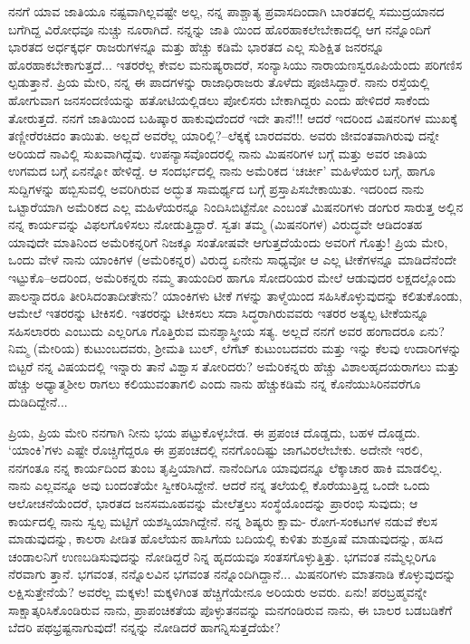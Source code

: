 ನನಗೆ ಯಾವ ಜಾತಿಯೂ ನಷ್ಟವಾಗಿಲ್ಲವಷ್ಟೇ ಅಲ್ಲ, ನನ್ನ ಪಾಶ್ಚಾತ್ಯ ಪ್ರವಾಸದಿಂದಾಗಿ ಬಾರತದಲ್ಲಿ ಸಮುದ್ರಯಾನದ ಬಗೆಗಿದ್ದ ವಿರೋಧವೂ ನುಚ್ಚು ನೂರಾಗಿದೆ. ನನ್ನನ್ನು ಜಾತಿ ಯಿಂದ ಹೊರಹಾಕಲೇಬೇಕಾದಲ್ಲಿ ಆಗ ನನ್ನೊಂದಿಗೆ ಭಾರತದ ಅರ್ಧಕ್ಕರ್ಧ ರಾಜರುಗಳನ್ನೂ ಮತ್ತು ಹೆಚ್ಚು ಕಡಿಮೆ ಭಾರತದ ಎಲ್ಲ ಸುಶಿಕ್ಷಿತ ಜನರನ್ನೂ ಹೊರಹಾಕಬೇಕಾಗುತ್ತದೆ... ಇತರರೆಲ್ಲ ಕೇವಲ ಮನುಷ್ಯರಾದರೆ, ಸಂನ್ಯಾಸಿಯು ನಾರಾಯಣಸ್ವರೂಪಿಯೆಂದು ಪರಿಗಣಿಸ ಲ್ಪಡುತ್ತಾನೆ. ಪ್ರಿಯ ಮೇರಿ, ನನ್ನ ಈ ಪಾದಗಳನ್ನು ರಾಜಾಧಿರಾಜರು ತೊಳೆದು ಪೂಜಿಸಿದ್ದಾರೆ. ನಾನು ರಸ್ತೆಯಲ್ಲಿ ಹೋಗುವಾಗ ಜನಸಂದಣಿಯನ್ನು ಹತೋಟಿಯಲ್ಲಿಡಲು ಪೋಲಿಸರು ಬೇಕಾಗಿದ್ದರು ಎಂದು ಹೇಳಿದರೆ ಸಾಕೆಂದು ತೋರುತ್ತದೆ. ನನಗೆ ಜಾತಿಯಿಂದ ಬಹಿಷ್ಕಾರ ಹಾಕುವುದೆಂದರೆ ಇದೇ ತಾನೆ!!! ಆದರೆ ಇದರಿಂದ ವಿಷನರಿಗಳ ಮುಖಕ್ಕೆ ತಣ್ಣೀರೆರಚಿದಂ ತಾಯಿತು. ಅಲ್ಲದೆ ಅವರೆಲ್ಲ ಯಾರಿಲ್ಲಿ?–ಲೆಕ್ಕಕ್ಕೆ ಬಾರದವರು. ಅವರು ಜೀವಂತವಾಗಿರುವು ದನ್ನೇ ಅರಿಯದೆ ನಾವಿಲ್ಲಿ ಸುಖವಾಗಿದ್ದೆವು. ಉಪನ್ಯಾಸವೊಂದರಲ್ಲಿ ನಾನು ಮಿಷನರಿಗಳ ಬಗ್ಗೆ ಮತ್ತು ಅವರ ಜಾತಿಯ ಉಗಮದ ಬಗ್ಗೆ ಏನನ್ನೋ ಹೇಳಿದ್ದೆ. ಆ ಸಂದರ್ಭದಲ್ಲಿ ನಾನು ಅಮೆರಿಕದ ‘ಚರ್ಚೀ’ ಮಹಿಳೆಯರ ಬಗ್ಗೆ, ಹಾಗೂ ಸುದ್ದಿಗಳನ್ನು ಹಬ್ಬಿಸುವಲ್ಲಿ ಅವರಿಗಿರುವ ಅದ್ಭುತ ಸಾಮರ್ಥ್ಯದ ಬಗ್ಗೆ ಪ್ರಸ್ತಾಪಿಸಬೇಕಾಯಿತು. ಇದರಿಂದ ನಾನು ಒಟ್ಟಾರೆಯಾಗಿ ಅಮೆರಿಕದ ಎಲ್ಲ ಮಹಿಳೆಯರನ್ನೂ ನಿಂದಿಸಿಬಿಟ್ಟೆನೋ ಎಂಬಂತೆ ಮಿಷನರಿಗಳು ಡಂಗುರ ಸಾರುತ್ತ ಅಲ್ಲಿನ ನನ್ನ ಕಾರ್ಯವನ್ನು ವಿಫಲಗೊಳಿಸಲು ನೋಡುತ್ತಿದ್ದಾರೆ. ಸ್ವತಃ ತಮ್ಮ (ಮಿಷನರಿಗಳ) ವಿರುದ್ಧವೇ ಆಡಿದಂತಹ ಯಾವುದೇ ಮಾತಿನಿಂದ ಅಮೆರಿಕನ್ನರಿಗೆ ನಿಜಕ್ಕೂ ಸಂತೋಷವೇ ಆಗುತ್ತದೆಯೆಂದು ಅವರಿಗೆ ಗೊತ್ತು! ಪ್ರಿಯ ಮೇರಿ, ಒಂದು ವೇಳೆ ನಾನು ಯಾಂಕಿಗಳ (ಅಮೆರಿಕನ್ನರ) ವಿರುದ್ಧ ಏನೇನು ಸಾಧ್ಯವೋ ಆ ಎಲ್ಲ ಟೀಕೆಗಳನ್ನೂ ಮಾಡಿದೆನೆಂದೇ ಇಟ್ಟುಕೊ–ಅದರಿಂದ, ಅಮೆರಿಕನ್ನರು ನಮ್ಮ ತಾಯಂದಿರ ಹಾಗೂ ಸೋದರಿಯರ ಮೇಲೆ ಆಡುವುದರ ಲಕ್ಷದಲ್ಲೊಂದು ಪಾಲನ್ನಾದರೂ ತೀರಿಸಿದಂತಾದೀತೇನು? ಯಾಂಕಿಗಳು ಟೀಕೆ ಗಳನ್ನು ತಾಳ್ಮೆಯಿಂದ ಸಹಿಸಿಕೊಳ್ಳುವುದನ್ನು ಕಲಿತುಕೊಂಡು, ಆಮೇಲೆ ಇತರರನ್ನು ಟೀಕಿಸಲಿ. ಇತರರನ್ನು ಟೀಕಿಸಲು ಸದಾ ಸಿದ್ಧರಾಗಿರುವವರು ಇತರರ ಅತ್ಯಲ್ಪ ಟೀಕೆಯನ್ನೂ ಸಹಿಸಲಾರರು ಎಂಬುದು ಎಲ್ಲರಿಗೂ ಗೊತ್ತಿರುವ ಮನಶ್ಶಾಸ್ತ್ರೀಯ ಸತ್ಯ. ಅಲ್ಲದೆ ನನಗೆ ಅವರ ಹಂಗಾದರೂ ಏನು? ನಿಮ್ಮ (ಮೇರಿಯ) ಕುಟುಂಬದವರು, ಶ್ರೀಮತಿ ಬುಲ್, ಲೆಗೆಟ್ ಕುಟುಂಬದವರು ಮತ್ತು ಇನ್ನು ಕೆಲವು ಉದಾರಿಗಳನ್ನು ಬಿಟ್ಟರೆ ನನ್ನ ವಿಷಯದಲ್ಲಿ ಇನ್ನಾರು ತಾನೆ ವಿಶ್ವಾಸ ತೋರಿದರು? ಅಮೆರಿಕನ್ನರು ಹೆಚ್ಚು ವಿಶಾಲಹೃದಯರಾಗಲು ಮತ್ತು ಹೆಚ್ಚು ಅಧ್ಯಾತ್ಮಶೀಲ ರಾಗಲು ಕಲಿಯುವಂತಾಗಲಿ ಎಂದು ನಾನು ಹೆಚ್ಚುಕಡಿಮೆ ನನ್ನ ಕೊನೆಯುಸಿರಿನವರೆಗೂ ದುಡಿದಿದ್ದೇನೆ... 

ಪ್ರಿಯ, ಪ್ರಿಯ ಮೇರಿ ನನಗಾಗಿ ನೀನು ಭಯ ಪಟ್ಟುಕೊಳ್ಳಬೇಡ. ಈ ಪ್ರಪಂಚ ದೊಡ್ಡದು, ಬಹಳ ದೊಡ್ಡದು. ‘ಯಾಂಕಿ’ಗಳು ಎಷ್ಟೇ ರೊಚ್ಚಿಗೆದ್ದರೂ ಈ ಪ್ರಪಂಚದಲ್ಲಿ ನನಗೊಂದಿಷ್ಟು ಜಾಗವಿರಲೇಬೇಕು. ಅದೇನೇ ಇರಲಿ, ನನಗಂತೂ ನನ್ನ ಕಾರ್ಯದಿಂದ ತುಂಬ ತೃಪ್ತಿಯಾಗಿದೆ. ನಾನೆಂದಿಗೂ ಯಾವುದನ್ನೂ ಲೆಕ್ಕಾಚಾರ ಹಾಕಿ ಮಾಡಲಿಲ್ಲ. ನಾನು ಎಲ್ಲವನ್ನೂ ಅವು ಬಂದಂತೆಯೇ ಸ್ವೀಕರಿಸಿದ್ದೇನೆ. ಆದರೆ ನನ್ನ ತಲೆಯಲ್ಲಿ ಕೊರೆಯುತ್ತಿದ್ದ ಒಂದೇ ಒಂದು ಆಲೋಚನೆಯೆಂದರೆ, ಭಾರತದ ಜನಸಮೂಹವನ್ನು ಮೇಲೆತ್ತಲು ಸಂಸ್ಥೆಯೊಂದನ್ನು ಪ್ರಾರಂಭಿ ಸುವುದು; ಆ ಕಾರ್ಯದಲ್ಲಿ ನಾನು ಸ್ವಲ್ಪ ಮಟ್ಟಿಗೆ ಯಶಸ್ವಿಯಾಗಿದ್ದೇನೆ. ನನ್ನ ಶಿಷ್ಯರು ಕ್ಷಾಮ- ರೋಗ-ಸಂಕಟಗಳ ನಡುವೆ ಕೆಲಸ ಮಾಡುವುದನ್ನು, ಕಾಲರಾ ಪೀಡಿತ ಹೊಲೆಯನ ಹಾಸಿಗೆಯ ಬದಿಯಲ್ಲಿ ಕುಳಿತು ಶುಶ್ರೂಷೆ ಮಾಡುವುದನ್ನು, ಹಸಿದ ಚಂಡಾಲನಿಗೆ ಉಣಬಡಿಸುವುದನ್ನು ನೋಡಿದ್ದರೆ ನಿನ್ನ ಹೃದಯವೂ ಸಂತಸಗೊಳ್ಳುತ್ತಿತ್ತು. ಭಗವಂತ ನಮ್ಮೆಲ್ಲರಿಗೂ ನೆರವಾಗು ತ್ತಾನೆ. ಭಗವಂತ, ನನ್ನೊಲವಿನ ಭಗವಂತ ನನ್ನೊಂದಿಗಿದ್ದಾನೆ... ಮಿಷನರಿಗಳು ಮಾತನಾಡಿ ಕೊಳ್ಳುವುದನ್ನು ಲಕ್ಷಿಸುತ್ತೇನೆಯೆ? ಅವರೆಲ್ಲ ಮಕ್ಕಳು! ಮಕ್ಕಳಿಗಿಂತ ಹೆಚ್ಚಿಗೆಯೇನೂ ಅರಿಯರು ಅವರು. ಏನು! ಪರಬ್ರಹ್ಮವನ್ನೇ ಸಾಕ್ಷಾತ್ಕರಿಸಿಕೊಂಡಿರುವ ನಾನು, ಪ್ರಾಪಂಚಿಕತೆಯ ಪೊಳ್ಳುತನವನ್ನು ಮನಗಂಡಿರುವ ನಾನು, ಈ ಬಾಲರ ಬಡಬಡಿಕೆಗೆ ಬೆದರಿ ಪಥಭ್ರಷ್ಟನಾಗುವುದೆ! ನನ್ನನ್ನು ನೋಡಿದರೆ ಹಾಗನ್ನಿಸುತ್ತದೆಯೇ?


